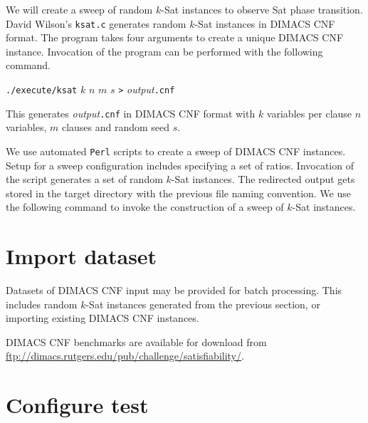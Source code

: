 	We will create a sweep of random $k$-{\sc Sat} instances to observe {\sc Sat} phase transition.  David Wilson's \texttt{ksat.c} generates random $k$-{\sc Sat} instances in DIMACS CNF format.  The program takes four arguments to create a unique DIMACS CNF instance.  Invocation of the program can be performed with the following command.

\begin{center}

\texttt{./execute/ksat} $k$ $n$ $m$ $s$ \texttt{>} \textit{output}\texttt{.cnf}

\end{center}

This generates \textit{output}\texttt{.cnf} in DIMACS CNF format with $k$ variables per clause $n$ variables, $m$ clauses and random seed $s$.


We use automated \texttt{Perl} scripts to create a sweep of DIMACS CNF instances.  Setup for a sweep configuration includes specifying a set of ratios.  Invocation of the script generates a set of random $k$-{\sc Sat} instances.  The redirected output gets stored in the target directory with the previous file naming convention.  We use the following command to invoke the construction of a sweep of $k$-{\sc Sat} instances.







	\section{Import dataset}


Datasets of DIMACS CNF input may be provided for batch processing.  This includes random $k$-{\sc Sat} instances generated from the previous section, or importing existing DIMACS CNF instances.   


DIMACS CNF benchmarks are available for download from \url{ftp://dimacs.rutgers.edu/pub/challenge/satisfiability/}.


	\section{Configure test}


